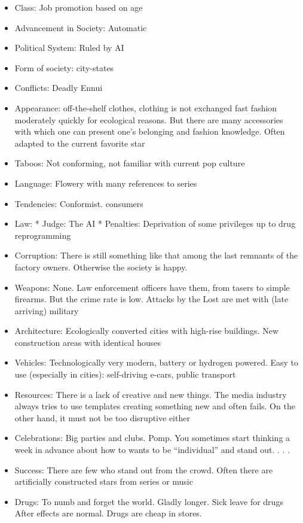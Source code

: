 \begin{itemize}
    \item Class: Job promotion based on age
    \item Advancement in Society: Automatic
    \item Political System: Ruled by AI
    \item Form of society: city-states
    \item Conflicts: Deadly Ennui
    \item Appearance: off-the-shelf clothes, clothing is not exchanged fast fashion moderately quickly for ecological reasons. But there are many accessories with which one can present one's belonging and fashion knowledge. Often adapted to the current favorite star
    \item Taboos: Not conforming, not familiar with current pop culture
    \item Language: Flowery with many references to series
    \item Tendencies: Conformist. consumers
    \item Law: * Judge: The AI * Penalties: Deprivation of some privileges up to drug reprogramming
    \item Corruption: There is still something like that among the last remnants of the factory owners. Otherwise the society is happy.
    \item Weapons: None. Law enforcement officers have them, from tasers to simple firearms. But the crime rate is low. Attacks by the Lost are met with (late arriving) military
    \item Architecture: Ecologically converted cities with high-rise buildings. New construction areas with identical houses
    \item Vehicles: Technologically very modern, battery or hydrogen powered. Easy to use (especially in cities): self-driving e-cars, public transport
    \item Resources: There is a lack of creative and new things. The media industry always tries to use templates creating something new and often fails. On the other hand, it must not be too disruptive either
    \item Celebrations: Big parties and clubs. Pomp. You sometimes start thinking a week in advance about how to wants to be “individual” and stand out. . . .
    \item Success: There are few who stand out from the crowd. Often there are artificially constructed stars from series or music
    \item Drugs: To numb and forget the world. Gladly longer. Sick leave for drugs After effects are normal. Drugs are cheap in stores.

\end{itemize}
